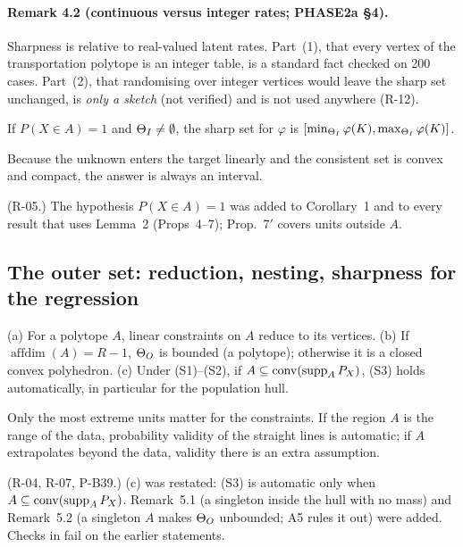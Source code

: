 \paragraph{Remark 4.2 (continuous versus integer rates; PHASE2a \S4).}
Sharpness is relative to real-valued latent rates. Part~(1), that every vertex of
the transportation polytope is an integer table, is a standard fact checked on
200 cases. Part~(2), that randomising over integer vertices would leave the
sharp set unchanged, is \emph{only a sketch} (not verified) and is not used
anywhere (R-12).

\begin{result}
 If $P(X\in A)=1$ and $\Theta_I\ne\emptyset$, the sharp set for
$\varphi$ is $[\min_{\Theta_I}\varphi(K),\max_{\Theta_I}\varphi(K)]$.
\end{result}
\begin{plain}
Because the unknown enters the target linearly and the consistent set is convex
and compact, the answer is always an interval.
\end{plain}
\begin{revnote}(R-05.) The hypothesis $P(X\in A)=1$ was added to Corollary~1 and to every result that uses Lemma~2 (Props~4--7); Prop.~7$'$ covers units outside $A$.\end{revnote}

\subsection{The outer set: reduction, nesting, sharpness for the regression}

\begin{result}\label{res:p2a-l3}
 (a) For a polytope $A$, linear constraints on $A$ reduce to its
vertices. (b) If $\operatorname{affdim}(A)=R-1$, $\Theta_O$ is bounded (a polytope);
otherwise it is a closed convex polyhedron. (c) Under (S1)--(S2), if
$A\subseteq\operatorname{conv}(\operatorname{supp}_AP_X)$, (S3) holds automatically, in particular for the
population hull.
\end{result}
\begin{plain}
Only the most extreme units matter for the constraints. If the region $A$ is
the range of the data, probability validity of the straight lines is automatic;
if $A$ extrapolates beyond the data, validity there is an extra assumption.
\end{plain}
\begin{revnote}
(R-04, R-07, P-B39.) (c) was restated: (S3) is automatic only when
$A\subseteq\operatorname{conv}(\operatorname{supp}_AP_X)$. Remark~5.1 (a singleton inside the hull with no
mass) and Remark~5.2 (a singleton $A$ makes $\Theta_O$ unbounded; A5 rules it out)
were added. Checks in  fail on the earlier statements.
\end{revnote}

